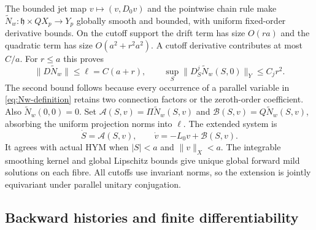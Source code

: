 The bounded jet map $v\mapsto(v,D_0v)$ and the pointwise
chain rule make $\widetilde N_w:\mathfrak h\times QX_p\to Y_p$
globally smooth and bounded, with uniform fixed-order
derivative bounds. On the cutoff support the drift term
has size $O(ra)$ and the quadratic term has size $O(a^2+r^2a^2)$.
A cutoff derivative contributes at most $C/a$.
For $r\le a$ this proves
\begin{equation}\label{eq:extended-small-lipschitz}
 \|D\widetilde N_w\|\le\ell=C(a+r),\qquad
 \sup_S\|D_S^j\widetilde N_w(S,0)\|_Y\le C_jr^2.
\end{equation}
The second bound follows because every occurrence of a
parallel variable in \eqref{eq:Nw-definition} retains two
connection factors or the zeroth-order coefficient.
Also $\widetilde N_w(0,0)=0$.
Set
$\mathcal A(S,v)=\Pi\widetilde N_w(S,v)$ and
$\mathcal B(S,v)=Q\widetilde N_w(S,v)$, absorbing the
uniform projection norms into $\ell$. The extended system is
\begin{equation}\label{eq:extended-system}
 \dot S=\mathcal A(S,v),\qquad
 \dot v=-L_0v+\mathcal B(S,v).
\end{equation}
It agrees with actual HYM when $|S|<a$ and $\|v\|_X<a$.
The integrable smoothing kernel and global Lipschitz bounds
give unique global forward mild solutions on each fibre.
All cutoffs use invariant norms, so the extension is
jointly equivariant under parallel unitary conjugation.

\subsection{Backward histories and finite differentiability}

